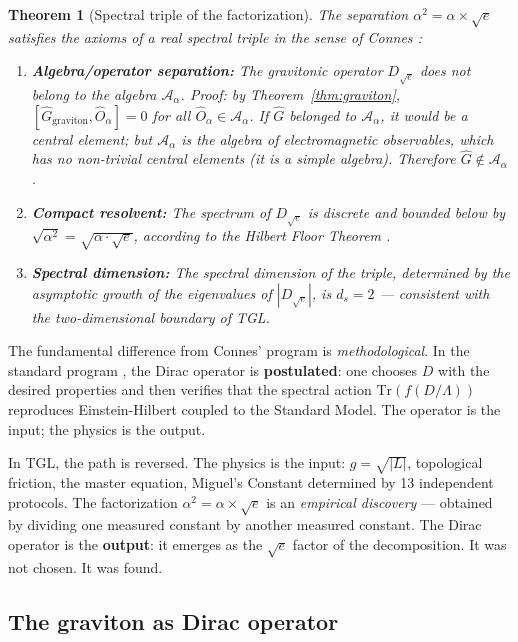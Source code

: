 \documentclass[12pt,a4paper,twoside]{article}
\newtheorem{theorem}{Theorem}[section]
\newcommand{\alphaii}{\alpha^{2}}
\newcommand{\boundary}{\textit{boundary}}
\begin{document}
\begin{theorem}[Spectral triple of the factorization]
\label{thm:tripla}
The separation $\alphaii = \alpha \times \sqrt{e}$ satisfies the axioms of a real spectral triple in the sense of Connes \cite{Connes1996}:
\begin{enumerate}[nosep]
\item \textbf{Algebra/operator separation:} The gravitonic operator $D_{\sqrt{e}}$ does not belong to the algebra $\mathcal{A}_\alpha$. Proof: by Theorem~\ref{thm:graviton}, $[\hat{G}_{\text{graviton}}, \hat{O}_\alpha] = 0$ for all $\hat{O}_\alpha \in \mathcal{A}_\alpha$. If $\hat{G}$ belonged to $\mathcal{A}_\alpha$, it would be a central element; but $\mathcal{A}_\alpha$ is the algebra of electromagnetic observables, which has no non-trivial central elements (it is a simple algebra). Therefore $\hat{G} \notin \mathcal{A}_\alpha$.
\item \textbf{Compact resolvent:} The spectrum of $D_{\sqrt{e}}$ is discrete and bounded below by $\sqrt{\alphaii} = \sqrt{\alpha \cdot \sqrt{e}}$, according to the Hilbert Floor Theorem \cite{Miguel2026Graviton}.
\item \textbf{Spectral dimension:} The spectral dimension of the triple, determined by the asymptotic growth of the eigenvalues of $|D_{\sqrt{e}}|$, is $d_s = 2$ --- consistent with the two-dimensional \boundary{} of TGL.
\end{enumerate}
\end{theorem}

The fundamental difference from Connes' program is \textit{methodological}. In the standard program \cite{Connes1996, Chamseddine1997}, the Dirac operator is \textbf{postulated}: one chooses $D$ with the desired properties and then verifies that the spectral action $\text{Tr}(f(D/\Lambda))$ reproduces Einstein-Hilbert coupled to the Standard Model. The operator is the input; the physics is the output.

In TGL, the path is reversed. The physics is the input: $g = \sqrt{|L|}$, topological friction, the master equation, Miguel's Constant determined by 13 independent protocols. The factorization $\alphaii = \alpha \times \sqrt{e}$ is an \textit{empirical discovery} --- obtained by dividing one measured constant by another measured constant. The Dirac operator is the \textbf{output}: it emerges as the $\sqrt{e}$ factor of the decomposition. It was not chosen. It was found.


\subsection{The graviton as Dirac operator}
\label{subsec:dirac}
\end{document}

